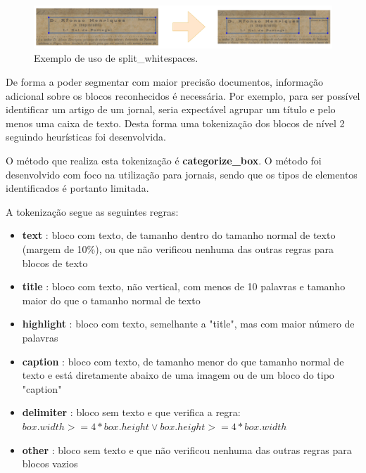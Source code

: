 \begin{figure}[H]
	\centering
	\includegraphics[width=1\textwidth]{images/ilustracoes/split_by_whitespaces_blocks.png}
	\caption{Exemplo de uso de split\_whitespaces.}
	\label{fig:split_by_whitespaces_blocks}
\end{figure}


\label{contribution_categorize_blocks}

De forma a poder segmentar com maior precisão documentos, informação adicional sobre os blocos reconhecidos é necessária. Por exemplo, para ser possível identificar um artigo de um jornal, seria expectável agrupar um título e pelo menos uma caixa de texto. Desta forma uma tokenização dos blocos de nível 2 seguindo heurísticas foi desenvolvida.

O método que realiza esta tokenização é \textbf{categorize\_box}. O método foi desenvolvido com foco na utilização para jornais, sendo que os tipos de elementos identificados é portanto limitada.

A tokenização segue as seguintes regras:

\begin{itemize}\setlength\itemsep{-0.3em}
	\item \textbf{text} 		: bloco com texto, de tamanho dentro do tamanho normal de texto (margem de 10\%), ou que não verificou nenhuma das outras regras para blocos de texto
	\item \textbf{title} 	: bloco com texto, não vertical, com menos de 10 palavras e tamanho maior do que o tamanho normal de texto
	\item \textbf{highlight} : bloco com texto, semelhante a "title", mas com maior número de palavras
	\item \textbf{caption} 	: bloco com texto, de tamanho menor do que tamanho normal de texto e está diretamente abaixo de uma imagem ou de um bloco do tipo "caption"
	\item \textbf{delimiter} : bloco sem texto e que verifica a regra: $box.width >= 4*box.height \vee box.height >= 4*box.width$
	\item \textbf{other} 	: bloco sem texto e que não verificou nenhuma das outras regras para blocos vazios
\end{itemize}

